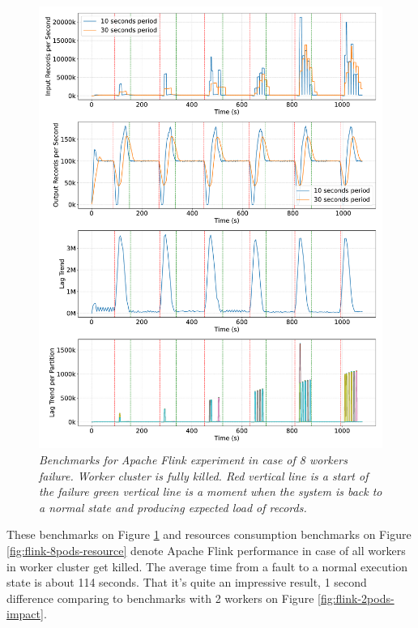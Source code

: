 \begin{figure}[H]
    \centering
    \includegraphics[width=1\textwidth]{figures/flink-8pods/flink_8_pods_plot_impact}
    \caption{\textit{Benchmarks for Apache Flink experiment in case of 8 workers failure.
    Worker cluster is fully killed. Red vertical line is a start of the failure green vertical line is a moment when the system is back
    to a normal state and producing expected load of records.}}
    \label{fig:flink-8pods-impact}
\end{figure}

These benchmarks on Figure \ref{fig:flink-8pods-impact} and resources consumption benchmarks on Figure \ref{fig:flink-8pods-resource}
denote Apache Flink performance in case of all workers in worker cluster get killed.
The average time from a fault to a normal execution state is about 114 seconds.
That it's quite an impressive result, 1 second difference comparing to benchmarks
with 2 workers on Figure \ref{fig:flink-2pods-impact}.


